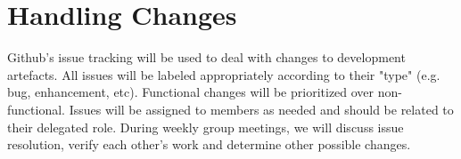 \documentclass[12pt, titlepage]{article}
\begin{document}
\section{Handling Changes}
Github's issue tracking will be used to deal with changes to development artefacts.  All issues will be labeled appropriately according to their "type" (e.g. bug, enhancement, etc).  Functional changes will be prioritized over non-functional.  Issues will be assigned to members as needed and should be related to their delegated role.  During weekly group meetings, we will discuss issue resolution, verify each other's work and determine other possible changes.



% 
% 
\end{document}
